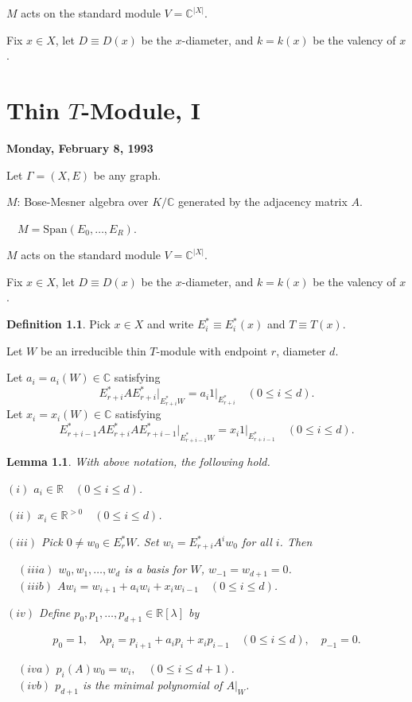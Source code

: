\documentclass[
]{book}
\newtheorem{lemma}{Lemma}[chapter]
\theoremstyle{definition}
\newtheorem{definition}{Definition}[chapter]
\theoremstyle{definition}
\theoremstyle{definition}
\theoremstyle{definition}
\theoremstyle{remark}
\begin{document}
\(M\) acts on the standard module \(V = \mathbb{C}^{|X|}\).

Fix \(x\in X\), let
\(D \equiv D(x)\) be the \(x\)-diameter, and \(k = k(x)\) be the valency of \(x\).

\hypertarget{lec9}{%
\chapter{\texorpdfstring{Thin \(T\)-Module, I}{Thin T-Module, I}}\label{lec9}}

\textbf{Monday, February 8, 1993}

Let \(\Gamma = (X, E)\) be any graph.

\(M\): Bose-Mesner algebra over \(K/\mathbb{C}\) generated by the adjacency matrix \(A\).

\(\quad M = \mathrm{Span}(E_0, \ldots, E_R)\).

\(M\) acts on the standard module \(V = \mathbb{C}^{|X|}\).

Fix \(x\in X\), let
\(D \equiv D(x)\) be the \(x\)-diameter, and \(k = k(x)\) be the valency of \(x\).

\begin{definition}
Pick \(x\in X\) and write \(E_i^* \equiv E_i^*(x)\) and \(T \equiv T(x)\).

Let \(W\) be an irreducible thin \(T\)-module with endpoint \(r\), diameter \(d\).

Let \(a_i = a_i(W)\in \mathbb{C}\) satisfying
\[E_{r+i}^*A{E^*_{r+i}|}_{E_{r+i}^*W} = a_i1|_{E_{r+i}^*} \quad (0\leq i\leq d).\]
Let \(x_i = x_i(W)\in \mathbb{C}\) satisfying
\[E_{r+i-1}^*A{E^*_{r+i}AE^*_{r+i-1}|}_{E_{r+i-1}^*W} = x_i1|_{E_{r+i-1}^*} \quad (0\leq i\leq d).\]
\end{definition}

\begin{lemma}
\protect\hypertarget{lem:thin-module-structure}{}\label{lem:thin-module-structure}With above notation, the following hold.

\((i)\) \(a_i\in \mathbb{R} \quad (0\leq i\leq d)\).

\((ii)\) \(x_i\in \mathbb{R}^{>0} \quad (0\leq i\leq d)\).

\((iii)\) Pick \(0\neq w_0\in E^*_rW\). Set \(w_i = E^*_{r+i}A^iw_0\) for all \(i\). Then

\(\quad (iiia)\) \(w_0, w_1, \ldots, w_d\) is a basis for \(W\), \(w_{-1} = w_{d+1} = 0\).\\
\(\quad (iiib)\) \(Aw_i = w_{i+1} + a_iw_{i} + x_iw_{i-1} \quad (0\leq i\leq d)\).

\((iv)\) Define \(p_0, p_1, \ldots, p_{d+1}\in \mathbb{R}[\lambda]\) by

\[p_0 = 1, \quad \lambda p_i = p_{i+1} + a_i p_i + x_i p_{i-1} \quad (0\leq i\leq d),\quad p_{-1} = 0.\]

\(\quad (iva)\) \(p_i(A)w_0 = w_i, \quad (0\leq i\leq d+1)\).\\
\(\quad (ivb)\) \(p_{d+1}\) is the minimal polynomial of \(A|_W\).
\end{lemma}
\end{document}

